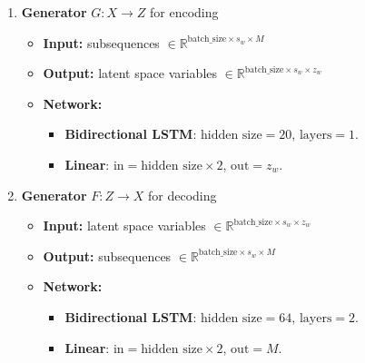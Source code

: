 \begin{enumerate}
    \item \textbf{Generator} $G: X \to Z$ for encoding
    \begin{itemize}
        \item \textbf{Input:} subsequences $ \in \mathbb{R}^{\text{batch\_size} \times s_w \times M}$
        \item \textbf{Output:} latent space variables $ \in \mathbb{R}^{\text{batch\_size} \times s_w \times z_w}$
        \item \textbf{Network:} 
            \begin{itemize}
                \item \textbf{Bidirectional LSTM}: $\text{hidden size} = 20$, $\text{layers} = 1$.
                \item \textbf{Linear}: $\text{in} = \text{hidden size} \times 2$, $\text{out} = z_w$.
            \end{itemize}
    \end{itemize}

    \item \textbf{Generator} $F: Z \to X$ for decoding
    \begin{itemize}
        \item \textbf{Input:} latent space variables $ \in \mathbb{R}^{\text{batch\_size} \times s_w \times z_w}$
        \item \textbf{Output:} subsequences $ \in \mathbb{R}^{\text{batch\_size} \times s_w \times M}$
        \item \textbf{Network:} 
            \begin{itemize}
                \item \textbf{Bidirectional LSTM}: $\text{hidden size} = 64$, $\text{layers} = 2$.
                \item \textbf{Linear}: $\text{in} = \text{hidden size} \times 2$, $\text{out} = M$.
            \end{itemize}
    \end{itemize}


\end{enumerate}
